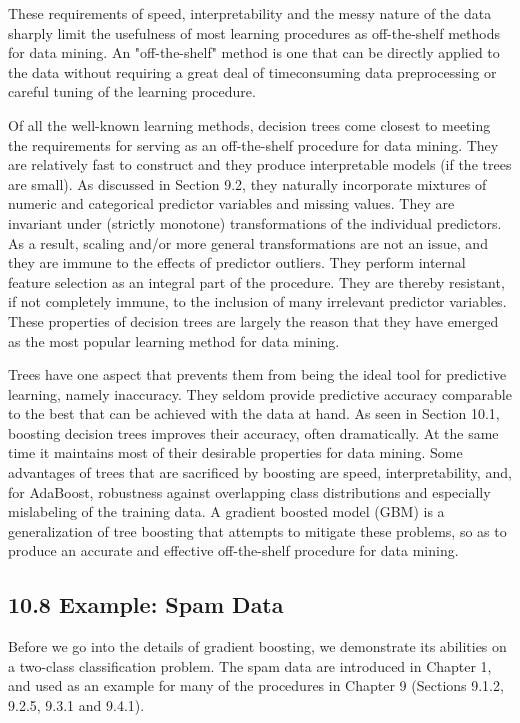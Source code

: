 \documentclass[10pt]{article}
\begin{document}
These requirements of speed, interpretability and the messy nature of the data sharply limit the usefulness of most learning procedures as off-the-shelf methods for data mining. An "off-the-shelf" method is one that can be directly applied to the data without requiring a great deal of timeconsuming data preprocessing or careful tuning of the learning procedure.

Of all the well-known learning methods, decision trees come closest to meeting the requirements for serving as an off-the-shelf procedure for data mining. They are relatively fast to construct and they produce interpretable models (if the trees are small). As discussed in Section 9.2, they naturally incorporate mixtures of numeric and categorical predictor variables and missing values. They are invariant under (strictly monotone) transformations of the individual predictors. As a result, scaling and/or more general transformations are not an issue, and they are immune to the effects of predictor outliers. They perform internal feature selection as an integral part of the procedure. They are thereby resistant, if not completely immune, to the inclusion of many irrelevant predictor variables. These properties of decision trees are largely the reason that they have emerged as the most popular learning method for data mining.

Trees have one aspect that prevents them from being the ideal tool for predictive learning, namely inaccuracy. They seldom provide predictive accuracy comparable to the best that can be achieved with the data at hand. As seen in Section 10.1, boosting decision trees improves their accuracy, often dramatically. At the same time it maintains most of their desirable properties for data mining. Some advantages of trees that are sacrificed by boosting are speed, interpretability, and, for AdaBoost, robustness against overlapping class distributions and especially mislabeling of the training data. A gradient boosted model (GBM) is a generalization of tree boosting that attempts to mitigate these problems, so as to produce an accurate and effective off-the-shelf procedure for data mining.

\subsection*{10.8 Example: Spam Data}
Before we go into the details of gradient boosting, we demonstrate its abilities on a two-class classification problem. The spam data are introduced in Chapter 1, and used as an example for many of the procedures in Chapter 9 (Sections 9.1.2, 9.2.5, 9.3.1 and 9.4.1).
\end{document}
